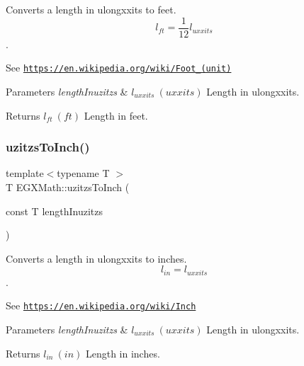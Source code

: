 Converts a length in ulongxxits to feet. \[ l_{ft}= \frac{1}{12} l_{uxxits} \]. 

See \href{https://en.wikipedia.org/wiki/Foot_(unit)}{\tt https\+://en.\+wikipedia.\+org/wiki/\+Foot\+\_\+(unit)} 
\begin{DoxyParams}{Parameters}
{\em length\+Inuzitzs} & $ l_{uxxits}\ (uxxits)$ Length in ulongxxits. \\
\hline
\end{DoxyParams}
\begin{DoxyReturn}{Returns}
$ l_{ft}\ (ft)$ Length in feet. 
\end{DoxyReturn}
\mbox{\label{group___e_g_x_math-_conversions-_length_conversions-uzitzs-_imperial_gad471f5c0b894eb0f2850a19347306ed4}} 
\subsubsection{\texorpdfstring{uzitzs\+To\+Inch()}{uzitzsToInch()}}
{\footnotesize\ttfamily template$<$typename T $>$ \\
T E\+G\+X\+Math\+::uzitzs\+To\+Inch (\begin{DoxyParamCaption}\item[{const T}]{length\+Inuzitzs }\end{DoxyParamCaption})}



Converts a length in ulongxxits to inches. \[ l_{in}=l_{uxxits} \]. 

See \href{https://en.wikipedia.org/wiki/Inch}{\tt https\+://en.\+wikipedia.\+org/wiki/\+Inch} 
\begin{DoxyParams}{Parameters}
{\em length\+Inuzitzs} & $ l_{uxxits}\ (uxxits)$ Length in ulongxxits. \\
\hline
\end{DoxyParams}
\begin{DoxyReturn}{Returns}
$ l_{in}\ (in)$ Length in inches. 
\end{DoxyReturn}
\mbox{\label{group___e_g_x_math-_conversions-_length_conversions-uzitzs-_imperial_ga53d4abecb2e7ac39c15c4ef89b9447a9}} 
